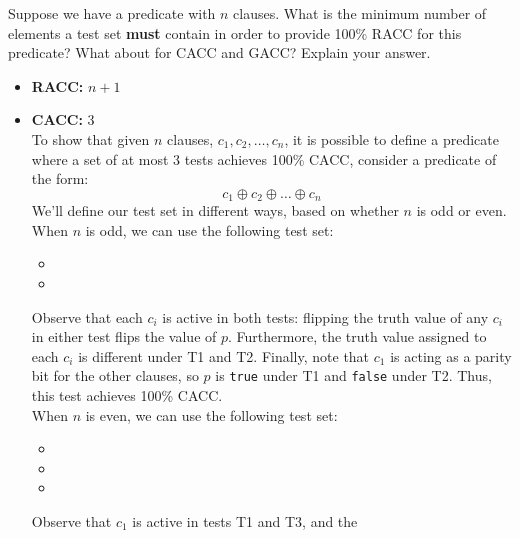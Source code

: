 \documentclass[addpoints, answers]{exam}
\newcommand{\Code}[1]{\texttt{#1}}
\begin{document}
\begin{questions}
\question[2] Suppose we have a predicate with $n$ clauses. What is the
  minimum number of elements a test set \textbf{must} contain in order
  to provide 100\% RACC for this predicate? What about for CACC and
  GACC? Explain your answer.   %
  \begin{solution}
    \begin{itemize}
      \item \textbf{RACC:} $n + 1$ \\
      \item \textbf{CACC:} 3 \\
        To show that given $n$ clauses, $c_1, c_2, \ldots, c_n$, it is
        possible to define a predicate where a set of at most 3 tests
        achieves 100\% CACC, consider a predicate of the form:
        \[
          c_1 \oplus c_2 \oplus \ldots \oplus c_n
        \]
        We'll define our test set in different ways, based on whether
        $n$ is odd or even. \\
        When $n$ is odd, we can use the following test set:
        \begin{itemize}
        \item [T1:] [$c_1 \mapsto$ \Code{true}, $\ldots$, $c_n \mapsto$ \Code{true}]
        \item [T2:] [$c_1 \mapsto$ \Code{false}, $\ldots$,
          $c_n \mapsto$ \Code{false}]
        \end{itemize}
        Observe that each $c_i$ is active in both tests: flipping the
        truth value of any $c_i$ in either test flips the value of
        $p$. Furthermore, the truth value assigned to each $c_i$ is
        different under T1 and T2. Finally, note that $c_1$ is acting
        as a parity bit for the other clauses, so $p$ is \Code{true}
        under T1 and \Code{false} under T2. Thus, this test achieves
        100\% CACC. \\
        When $n$ is even, we can use the following test set:
        \begin{itemize}
        \item [T1:] [$c_1 \mapsto$ \Code{true}, $\ldots$,
          $c_n \mapsto$ \Code{true}]
        \item [T2:] [$c_1 \mapsto$ \Code{true}, $c_2 \mapsto$
          \Code{false} $\ldots$, $c_n \mapsto$ \Code{false}]
        \item [T3:] [$c_1 \mapsto$ \Code{false}, $c_2 \mapsto$
          \Code{true} $\ldots$, $c_n \mapsto$ \Code{true}]
        \end{itemize}
        Observe that $c_1$ is active in tests T1 and T3, and the

\end{itemize}
\end{solution}
\end{questions}
\end{document}
